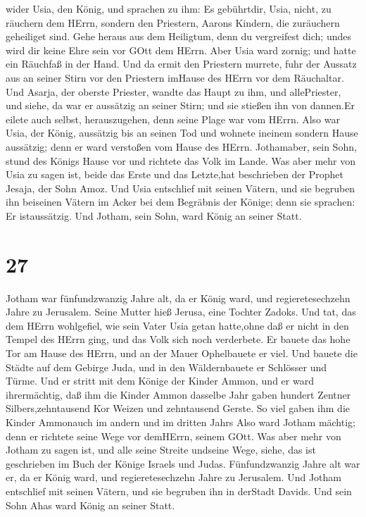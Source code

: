 wider Usia, den König, und sprachen zu ihm: Es gebührtdir, Usia, nicht,
zu räuchern dem HErrn, sondern den Priestern, Aarons Kindern, die
zuräuchern geheiliget sind. Gehe heraus aus dem Heiligtum, denn du
vergreifest dich; undes wird dir keine Ehre sein vor GOtt dem HErrn.
 Aber Usia ward zornig; und hatte ein Räuchfaß in der Hand.
Und da ermit den Priestern murrete, fuhr der Aussatz aus an seiner Stirn
vor den Priestern imHause des HErrn vor dem Räuchaltar. 
Und Asarja, der oberste Priester, wandte das Haupt zu ihm, und
allePriester, und siehe, da war er aussätzig an seiner Stirn; und sie
stießen ihn von dannen.Er eilete auch selbst, herauszugehen, denn seine
Plage war vom HErrn.  Also war Usia, der König, aussätzig
bis an seinen Tod und wohnete ineinem sondern Hause aussätzig; denn er
ward verstoßen vom Hause des HErrn. Jothamaber, sein Sohn, stund des
Königs Hause vor und richtete das Volk im Lande.  Was aber
mehr von Usia zu sagen ist, beide das Erste und das Letzte,hat
beschrieben der Prophet Jesaja, der Sohn Amoz.  Und Usia
entschlief mit seinen Vätern, und sie begruben ihn beiseinen Vätern im
Acker bei dem Begräbnis der Könige; denn sie sprachen: Er istaussätzig.
Und Jotham, sein Sohn, ward König an seiner Statt.

\hypertarget{section-26}{%
\section{27}\label{section-26}}

 Jotham war fünfundzwanzig Jahre alt, da er König ward, und
regieretesechzehn Jahre zu Jerusalem. Seine Mutter hieß Jerusa, eine
Tochter Zadoks.  Und tat, das dem HErrn wohlgefiel, wie sein
Vater Usia getan hatte,ohne daß er nicht in den Tempel des HErrn ging,
und das Volk sich noch verderbete.  Er bauete das hohe Tor
am Hause des HErrn, und an der Mauer Ophelbauete er viel. 
Und bauete die Städte auf dem Gebirge Juda, und in den Wäldernbauete er
Schlösser und Türme.  Und er stritt mit dem Könige der
Kinder Ammon, und er ward ihrermächtig, daß ihm die Kinder Ammon
dasselbe Jahr gaben hundert Zentner Silbers,zehntausend Kor Weizen und
zehntausend Gerste. So viel gaben ihm die Kinder Ammonauch im andern und
im dritten Jahrs  Also ward Jotham mächtig; denn er richtete
seine Wege vor demHErrn, seinem GOtt.  Was aber mehr von
Jotham zu sagen ist, und alle seine Streite undseine Wege, siehe, das
ist geschrieben im Buch der Könige Israels und Judas. 
Fünfundzwanzig Jahre alt war er, da er König ward, und regieretesechzehn
Jahre zu Jerusalem.  Und Jotham entschlief mit seinen
Vätern, und sie begruben ihn in derStadt Davids. Und sein Sohn Ahas ward
König an seiner Statt.


